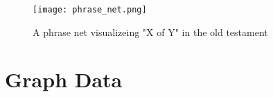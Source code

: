 \begin{figure}
	\centering
	\label{fig:phrasenet}
	\texttt{[image: phrase\_net.png]}
	\caption{A phrase net visualizeing "X of Y" in the old testament \cite{VanHam1987}}
\end{figure}




\section{Graph Data}
\label{sec:graph_data}


